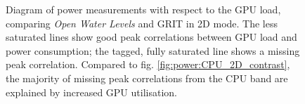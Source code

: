 \documentclass[review]{elsarticle}
\begin{document}
\begin{figure}[htbp!]
\begin{center}
	 	\begin{minipage}{\columnwidth}
	 		\centering
	 	\end{minipage}
	 	\begin{minipage}{\columnwidth}
	 		\centering
	 	\end{minipage}
	\caption{Diagram of power measurements with respect to the GPU load, comparing \textit{Open Water Levels} and GRIT in 2D mode. The less saturated lines show good peak correlations between GPU load and power consumption; the tagged, fully saturated line shows a missing peak correlation. Compared to fig. \ref{fig:power:CPU_2D_contrast}, the majority of missing peak correlations from the CPU band are explained by increased GPU utilisation.}
	\label{fig:power:GPU_2D_contrast}
\end{center}
\end{figure}
\end{document}
